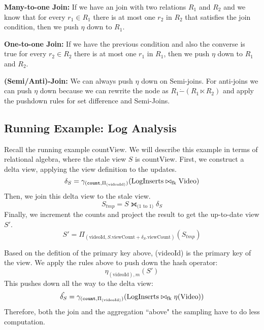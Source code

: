 \textbf{Many-to-one Join: } If we have an join with two relations $R_1$ and $R_2$ and we know that for every $r_1 \in R_1$ there is at most one $r_2$ in $R_2$ that satisfies the join condition, then we push $\eta$ down to $R_1$.

\textbf{One-to-one Join: } If we have the previous condition and also the converse is true for every $r_2 \in R_2$ there is at most one $r_1$ in $R_1$, then we push $\eta$ down to $R_1$ and $R_2$.

\textbf{(Semi/Anti)-Join: } We can always push $\eta$ down on Semi-joins. For anti-joins we can push $\eta$ down because we can rewrite the node as $R_1 \dot{-} (R_1 \ltimes R_2) $ and apply the pushdown rules for set difference and Semi-Joins.

\subsection{Running Example: Log Analysis}
Recall the running example \textsf{countView}.
We will describe this example in terms of relational algebra, where the stale view $S$ is \textsf{countView}.
First, we construct a delta view, applying the view definition to the updates.
\[
\delta_{S} = \gamma_{(\texttt{count},\Pi_{(\text{videoId})})}(\text{LogInserts} \bowtie_{\text{fk}} \text{Video})
\]
Then, we join this delta view to the stale view.
\[
  S_{tmp} = S \fullouterjoin_{\text{(1 to 1)}} \delta_{S}
\]
Finally, we increment the counts and project the result to get the up-to-date view $S'$.
\[
S' = \Pi_{(\text{videoId},S.\text{viewCount} + \delta_{S}.\text{viewCount})}(S_{tmp})
\]

Based on the defition of the primary key above, (videoId) is the primary key of the view.
We apply the rules above to push down the hash operator:
\[
\eta_{(\text{videoId}), m}(S')
\]
This pushes down all the way to the delta view:
\[
\hat{\delta_{S}} = \gamma_{(\texttt{count},\Pi_{(\text{videoId})})}(\text{LogInserts} \bowtie_{\text{fk}} \eta(\text{Video}))
\]
Therefore, both the join and the aggregation ``above" the sampling have to do less computation.
